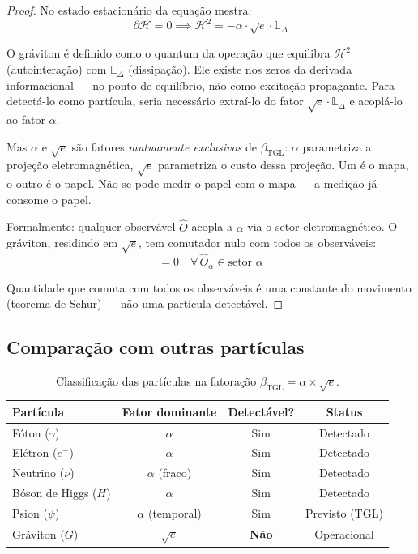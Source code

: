 \documentclass[12pt,a4paper,twoside]{article}
\newcommand{\betatgl}{\beta_{\!\scriptscriptstyle\mathrm{TGL}}}
\newcommand{\psion}{\psi}
\begin{document}
\begin{proof}
No estado estacionário da equação mestra:
\begin{equation}
\partial\mathcal{H} = 0 \implies \mathcal{H}^2 = -\alpha \cdot \sqrt{e} \cdot \mathbb{L}_\Delta
\end{equation}

O gráviton é definido como o quantum da operação que equilibra $\mathcal{H}^2$ (autointeração) com $\mathbb{L}_\Delta$ (dissipação). Ele existe nos zeros da derivada informacional --- no ponto de equilíbrio, não como excitação propagante. Para detectá-lo como partícula, seria necessário extraí-lo do fator $\sqrt{e} \cdot \mathbb{L}_\Delta$ e acoplá-lo ao fator $\alpha$.

Mas $\alpha$ e $\sqrt{e}$ são fatores \textit{mutuamente exclusivos} de $\betatgl$: $\alpha$ parametriza a projeção eletromagnética, $\sqrt{e}$ parametriza o custo dessa projeção. Um é o mapa, o outro é o papel. Não se pode medir o papel com o mapa --- a medição já consome o papel.

Formalmente: qualquer observável $\hat{O}$ acopla a $\alpha$ via o setor eletromagnético. O gráviton, residindo em $\sqrt{e}$, tem comutador nulo com todos os observáveis:
\begin{equation}
[\hat{G}_{\text{gráviton}}, \hat{O}_\alpha] = 0 \quad \forall\, \hat{O}_\alpha \in \text{setor } \alpha
\end{equation}

Quantidade que comuta com todos os observáveis é uma constante do movimento (teorema de Schur) --- não uma partícula detectável.
\end{proof}

\subsection{Comparação com outras partículas}

\begin{table}[H]
\centering
\caption{Classificação das partículas na fatoração $\betatgl = \alpha \times \sqrt{e}$.}
\label{tab:particulas}
\begin{tabular}{lccc}
\toprule
\textbf{Partícula} & \textbf{Fator dominante} & \textbf{Detectável?} & \textbf{Status} \\
\midrule
Fóton ($\gamma$) & $\alpha$ & Sim & Detectado \\
Elétron ($e^-$) & $\alpha$ & Sim & Detectado \\
Neutrino ($\nu$) & $\alpha$ (fraco) & Sim & Detectado \\
Bóson de Higgs ($H$) & $\alpha$ & Sim & Detectado \\
Psion ($\psion$) & $\alpha$ (temporal) & Sim & Previsto (TGL) \\
\midrule
Gráviton ($G$) & $\sqrt{e}$ & \textbf{Não} & Operacional \\
\bottomrule
\end{tabular}
\end{table}
\end{document}
